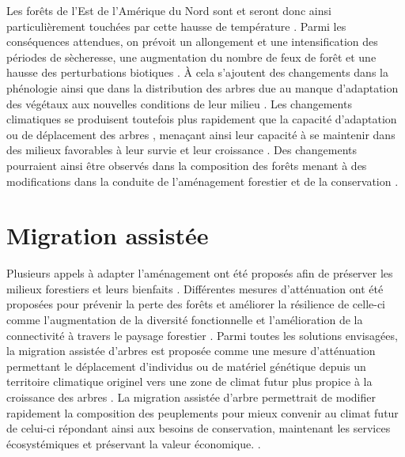 Les forêts de l'Est de l'Amérique du Nord sont et seront donc ainsi particulièrement touchées par cette hausse de température \citep{Park2014Canboreal,Mahony2017closerlook,Sittaro2017Treerange,Messier2022Warningnatural}.
Parmi les conséquences attendues, on prévoit un allongement et une intensification des périodes de sècheresse, une augmentation du nombre de feux de forêt et une hausse des perturbations biotiques \citep{Parmesan2007Influencesspecies,Joyce2013Climatechange,Gatti2021Amazoniacarbon,Heidari2021Effectsclimate}. 
À cela s'ajoutent des changements dans la phénologie \citep{Chuine2010Whydoes} ainsi que dans la distribution des arbres \citep{Zhu2012Failuremigrate,Gray2013Trackingsuitable} due au manque d'adaptation des végétaux aux nouvelles conditions de leur milieu \citep{Aitken2008Adaptationmigration}.
Les changements climatiques se produisent toutefois plus rapidement que la capacité d'adaptation ou de déplacement des arbres \citep{Aitken2008Adaptationmigration,Loarie2009velocityclimate,Vitt2010Assistedmigration,Harrison2020Plantcommunity}, 
menaçant ainsi leur capacité à se maintenir dans des milieux favorables à leur survie et leur croissance \citep{Zhu2012Failuremigrate,Sittaro2017Treerange,Woodall2018Decadalchanges}.
Des changements pourraient ainsi être observés dans la composition des forêts menant à des modifications dans la conduite de l'aménagement forestier et de la conservation \citep{McKenney2009Climatechange,Chmura2011Forestresponses,Lo2011Linkingclimate}.


\section*{Migration assistée}
\label{sec:fam}

Plusieurs appels à adapter l'aménagement ont été proposés afin de préserver les milieux forestiers et leurs bienfaits \citep{Nagel2017Adaptivesilviculture,Messier2021sakeresilience}.
Différentes mesures d'atténuation ont été proposées pour prévenir la perte des forêts et améliorer la résilience de celle-ci comme l'augmentation de la diversité fonctionnelle et l'amélioration de la connectivité à travers le paysage forestier \citep{Messier2019functionalcomplex}.
Parmi toutes les solutions envisagées, la migration assistée d'arbres est proposée comme une mesure d'atténuation permettant le déplacement d'individus ou de matériel génétique depuis un territoire climatique originel vers une zone de climat futur plus propice à la croissance des arbres \citep{Vitt2010Assistedmigration,Dumroese2015Considerationsrestoring,Park2018Informationunderload,Park2023Provenancetrials}. 
La migration assistée d'arbre permettrait de modifier rapidement la composition des peuplements pour mieux convenir au climat futur de celui-ci \citep{Pedlar2011implementationassisted} 
répondant ainsi aux besoins de conservation, maintenant les services écosystémiques et préservant la valeur économique. \citep{Ste-Marie2011Assistedmigration,Winder2011Ecologicalimplications}.


